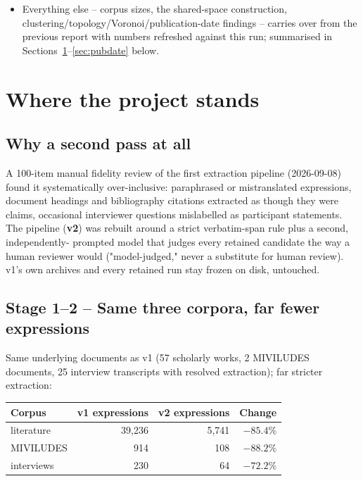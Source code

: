 \documentclass[11pt,a4paper]{article}
\newcommand{\jargon}[1]{\textbf{#1}}
\begin{document}
\begin{itemize}[leftmargin=1.4em]
  and a compact one-page-per-interview PDF tracing every kept expression
  and every domain-term mention back to its resolved pooled entity (or
  the exact filter it failed). Kept as a local QA artifact, not part of
  this document or the git repository, since it embeds verbatim
  participant quotes at bulk scale. Section~\ref{sec:qa-trace}.
  \item Everything else -- corpus sizes, the shared-space construction,
  clustering/topology/Voronoi/publication-date findings -- carries over
  from the previous report with numbers refreshed against this run;
  summarised in Sections~\ref{sec:stages}--\ref{sec:pubdate} below.
\end{itemize}

\section{Where the project stands}
\label{sec:stages}

\subsection{Why a second pass at all}
A 100-item manual fidelity review of the first extraction pipeline
(2026-09-08) found it systematically over-inclusive: paraphrased or
mistranslated expressions, document headings and bibliography citations
extracted as though they were claims, occasional interviewer questions
mislabelled as participant statements. The pipeline (\jargon{v2}) was
rebuilt around a strict verbatim-span rule plus a second, independently-
prompted model that judges every retained candidate the way a human
reviewer would ("model-judged," never a substitute for human review).
v1's own archives and every retained run stay frozen on disk, untouched.

\subsection{Stage 1--2 -- Same three corpora, far fewer expressions}
Same underlying documents as v1 (57 scholarly works, 2 MIVILUDES
documents, 25 interview transcripts with resolved extraction); far
stricter extraction:

\begin{table}[h!]
\centering
\begin{tabular}{lrrr}
\toprule
Corpus & v1 expressions & v2 expressions & Change \\
\midrule
literature & 39{,}236 & 5{,}741 & $-85.4\%$ \\
MIVILUDES & 914 & 108 & $-88.2\%$ \\
interviews & 230 & 64 & $-72.2\%$ \\
\bottomrule
\end{tabular}
\end{table}
\end{document}

